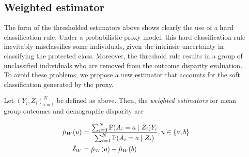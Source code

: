 

\subsection{Weighted estimator}

The form of the thresholded estimators above shows clearly the use of a hard classification rule.
Under a probabilistic proxy model, this hard classification rule inevitably misclassifies some individuals,  given the intrinsic uncertainty in classifying the protected class.
Moreover, the threshold rule results in a group of unclassified individuals who are removed from the outcome disparity evaluation. 
To avoid these problems, we propose a new estimator that accounts for the soft classification generated by the proxy.

\begin{definition}
\label{def:weighted_estimator}
Let $(Y_i, Z_i)_{i=1}^N$ be defined as above.
Then, the \emph{weighted estimators} for mean group outcomes and demographic disparity are

\begin{align}
\hat{\mu}_W(u) & = \frac{\sum_{i = 1}^N \mathbb{P}(A_i = a \mid Z_i)Y_i}{\sum_{i = 1}^N \mathbb{P}(A_i = a \mid Z_i)}, u\in\{a,b\}  \nonumber \\
\hat{\delta}_W & = \hat{\mu}_W(a) - \hat{\mu}_W(b) \label{demo: weight}
\end{align}
\end{definition}


